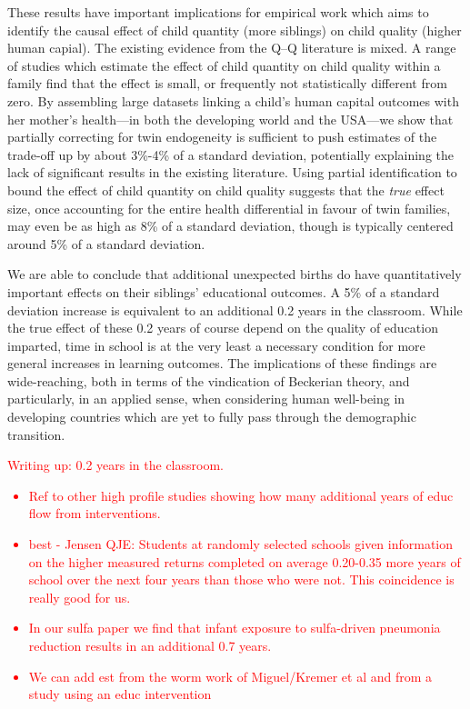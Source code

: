 \documentclass[subeqn]{article}
\begin{document}
\begin{spacing}{1.4}
These results have important implications for empirical work which aims to 
identify the causal effect of child quantity (more siblings) on child quality
(higher human capial).  The existing evidence from the Q--Q literature is 
mixed.  A range of studies which estimate the effect of child quantity on child 
quality within a family find that the effect is small, or frequently not 
statistically different from zero.  By assembling large datasets linking a 
child's human capital outcomes with her mother's health---in both the developing 
world and the USA---we show that partially correcting for twin endogeneity is 
sufficient to push estimates of the trade-off up by about 3\%-4\% of a standard 
deviation, potentially explaining the lack of significant results in the 
existing literature.  Using partial identification to bound the effect of child 
quantity on child quality suggests that the \emph{true} effect size, once 
accounting for the entire health differential in favour of twin families, may 
even be as high as 8\% of a standard deviation, though is typically centered
around 5\% of a standard deviation.

We are able to conclude that additional unexpected births do have
quantitatively important effects on their siblings' educational outcomes.  
A 5\% of a standard deviation increase is equivalent to an additional 0.2
years in the classroom.  While the true effect of these 0.2 years of course
depend on the quality of education imparted, time in school is at the very 
least a necessary condition for more general increases in learning outcomes.  
The implications of these findings are wide-reaching, both in terms of the 
vindication of Beckerian theory, and particularly, in an applied sense, when 
considering human well-being in developing countries which are yet to fully 
pass through the demographic transition.



\textcolor{red}{ Writing up: 0.2 years in the classroom.
\begin{itemize}
\item Ref to other high profile studies showing how many additional years of 
educ flow from interventions.
\item  best - Jensen QJE: Students at randomly selected schools given 
information on the higher measured returns completed on average 0.20-0.35 more 
years of school over the next four years than those who were not. This 
coincidence is really good for us.
\item In our sulfa paper we find that infant exposure to sulfa-driven pneumonia 
reduction results in an additional 0.7 years.
\item We can add est from the worm work of Miguel/Kremer et al and from a study 
using an educ intervention
\end{itemize}
}




\end{spacing}
\end{document}
